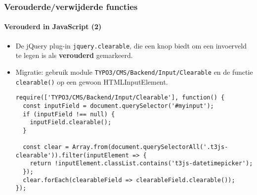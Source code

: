 
\begin{frame}[fragile]
	\frametitle{Verouderde/verwijderde functies}
	\framesubtitle{Verouderd in JavaScript (2)}

	\lstset{basicstyle=\tiny\ttfamily}

	\begin{itemize}
		\item De jQuery plug-in \texttt{jquery.clearable},
			die een knop biedt om een invoerveld te legen is als \textbf{verouderd} gemarkeerd.
		\item Migratie: gebruik module \small\texttt{TYPO3/CMS/Backend/Input/Clearable}\normalsize
			en de functie \texttt{clearable()} op een gewoon HTMLInputElement.

\begin{lstlisting}
require(['TYPO3/CMS/Backend/Input/Clearable'], function() {
  const inputField = document.querySelector('#myinput');
  if (inputField !== null) {
    inputField.clearable();
  }

  const clear = Array.from(document.querySelectorAll('.t3js-clearable')).filter(inputElement => {
    return !inputElement.classList.contains('t3js-datetimepicker');
  });
  clear.forEach(clearableField => clearableField.clearable());
});
\end{lstlisting}

	\end{itemize}

\end{frame}


